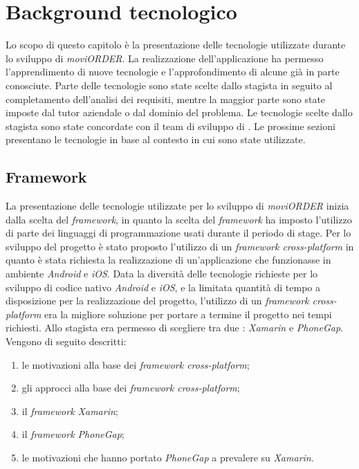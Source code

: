
\chapter{Background tecnologico} \label{background}

Lo scopo di questo capitolo è la presentazione delle tecnologie utilizzate durante lo sviluppo di \textit{moviORDER}. La realizzazione dell'applicazione ha permesso l'apprendimento di nuove tecnologie e l'approfondimento di alcune già in parte conosciute. Parte delle tecnologie sono state scelte dallo stagista in seguito al completamento dell'analisi dei requisiti, mentre la maggior parte sono state imposte dal tutor aziendale o dal dominio del problema. Le tecnologie scelte dallo stagista sono state concordate con il team di sviluppo di \visione{}. Le prossime sezioni presentano le tecnologie in base al contesto in cui sono state utilizzate.

\section{Framework}	

La presentazione delle tecnologie utilizzate per lo sviluppo di \textit{moviORDER} inizia dalla scelta del \textit{framework}, in quanto la scelta del \textit{framework} ha imposto l'utilizzo di parte dei linguaggi di programmazione usati durante il periodo di stage. Per lo sviluppo del progetto è stato proposto l'utilizzo di un \textit{framework cross-platform} in quanto è stata richiesta la realizzazione di un'applicazione che funzionasse in ambiente \textit{Android} e \textit{iOS}. Data la diversità delle tecnologie richieste per lo sviluppo di codice nativo \textit{Android} e \textit{iOS}, e la limitata quantità di tempo a disposizione per la realizzazione del progetto, l'utilizzo di un \textit{framework cross-platform} era la migliore soluzione per portare a termine il progetto nei tempi richiesti. Allo stagista era permesso di scegliere tra due : \textit{Xamarin} e \textit{PhoneGap}.\\ Vengono di seguito descritti:
\begin{enumerate}
	\item le motivazioni alla base dei \textit{framework cross-platform};
	\item gli approcci alla base dei \textit{framework cross-platform};
	\item il \textit{framework Xamarin};
	\item il \textit{framework PhoneGap};
	\item le motivazioni che hanno portato \textit{PhoneGap} a prevalere su \textit{Xamarin}.
\end{enumerate}

